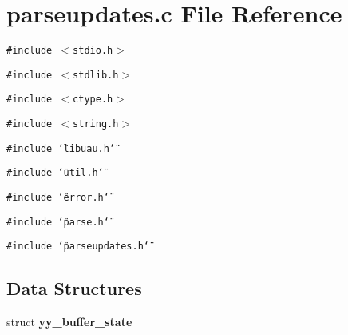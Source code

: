 \section{parseupdates.c File Reference}
\label{parseupdates_8c}
{\tt \#include $<$stdio.h$>$}\par
{\tt \#include $<$stdlib.h$>$}\par
{\tt \#include $<$ctype.h$>$}\par
{\tt \#include $<$string.h$>$}\par
{\tt \#include \char`\"{}libuau.h\char`\"{}}\par
{\tt \#include \char`\"{}util.h\char`\"{}}\par
{\tt \#include \char`\"{}error.h\char`\"{}}\par
{\tt \#include \char`\"{}parse.h\char`\"{}}\par
{\tt \#include \char`\"{}parseupdates.h\char`\"{}}\par
\subsection*{Data Structures}
\begin{CompactItemize}
\item 
struct {\bf yy\_\-buffer\_\-state}
\end{CompactItemize}
